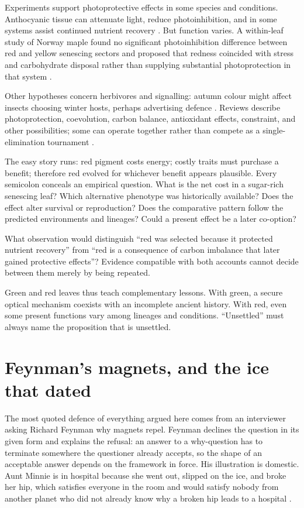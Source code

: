Experiments support photoprotective effects in some species and conditions. Anthocyanic tissue can attenuate light, reduce photoinhibition, and in some systems assist continued nutrient recovery \citep{feild2001,hoch2001,hoch2003}. But function varies. A within-leaf study of Norway maple found no significant photoinhibition difference between red and yellow senescing sectors and proposed that redness coincided with stress and carbohydrate disposal rather than supplying substantial photoprotection in that system \citep{mattila2023}.

Other hypotheses concern herbivores and signalling: autumn colour might affect insects choosing winter hosts, perhaps advertising defence \citep{archetti2000}. Reviews describe photoprotection, coevolution, carbon balance, antioxidant effects, constraint, and other possibilities; some can operate together rather than compete as a single-elimination tournament \citep{archetti2009,hughes2022,levyadun2022}.

The easy story runs: red pigment costs energy; costly traits must purchase a benefit; therefore red evolved for whichever benefit appears plausible. Every semicolon conceals an empirical question. What is the net cost in a sugar-rich senescing leaf? Which alternative phenotype was historically available? Does the effect alter survival or reproduction? Does the comparative pattern follow the predicted environments and lineages? Could a present effect be a later co-option?

\begin{openquestion}
What observation would distinguish ``red was selected because it protected nutrient recovery'' from ``red is a consequence of carbon imbalance that later gained protective effects''? Evidence compatible with both accounts cannot decide between them merely by being repeated.
\end{openquestion}

Green and red leaves thus teach complementary lessons. With green, a secure optical mechanism coexists with an incomplete ancient history. With red, even some present functions vary among lineages and conditions. ``Unsettled'' must always name the proposition that is unsettled.

\section{Feynman's magnets, and the ice that dated}

The most quoted defence of everything argued here comes from an interviewer asking Richard Feynman why magnets repel. Feynman declines the question in its given form and explains the refusal: an answer to a why-question has to terminate somewhere the questioner already accepts, so the shape of an acceptable answer depends on the framework in force. His illustration is domestic. Aunt Minnie is in hospital because she went out, slipped on the ice, and broke her hip, which satisfies everyone in the room and would satisfy nobody from another planet who did not already know why a broken hip leads to a hospital \citep{feynmanbbc1983}.

